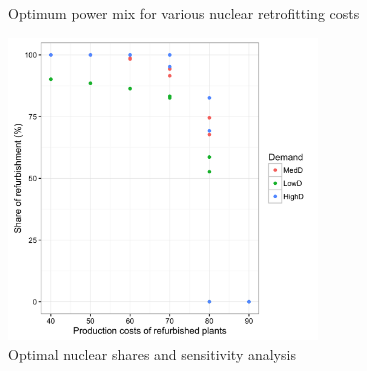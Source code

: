 \begin{figure}[!htp]
	\centering
	\caption{Optimum power mix for various nuclear retrofitting costs}
\end{figure}


\begin{figure}[!ht]
	\centering
	\includegraphics[height=8cm]{figures/powerMixSensitivity.png}
	\caption{Optimal nuclear shares and sensitivity analysis}
	\label{fig:powerMixSensitivity}
\end{figure}



